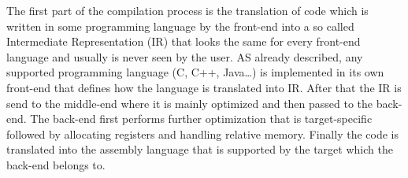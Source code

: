 \vspace{\baselineskip}
The first part of the compilation process is the translation of code which is written in some programming language by the front-end into a so called Intermediate Representation (IR) that looks the same for every front-end language and usually is never seen by the user. AS already described, any supported programming language (C, C++, Java…) is implemented in its own front-end that defines how the language is translated into IR. After that the IR is send to the middle-end where it is mainly optimized and then passed to the back-end. The back-end first performs further optimization that is target-specific followed by allocating registers and handling relative memory. Finally the code is translated into the assembly language that is supported by the target which the back-end belongs to.
